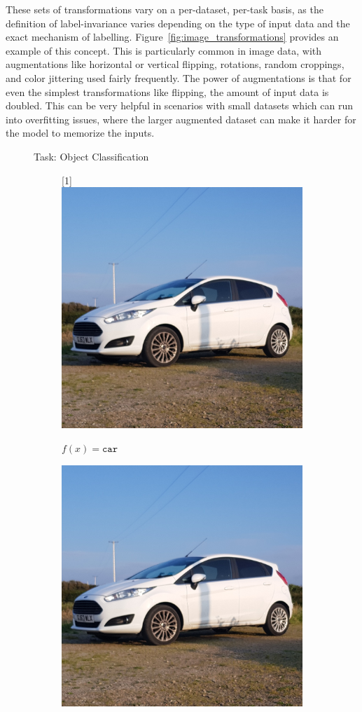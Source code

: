 \noindent These sets of transformations vary on a per-dataset, per-task basis, as the definition of label-invariance
varies depending on the type of input data and the exact mechanism of labelling. Figure~\ref{fig:image_transformations}
provides an example of this concept. This is particularly common in image data, with augmentations like horizontal
or vertical flipping, rotations, random croppings, and color jittering used fairly frequently. The power of augmentations
is that for even the simplest transformations like flipping, the amount of input data is doubled. This can be very helpful
in scenarios with small datasets which can run into overfitting issues, where the larger augmented dataset can make
it harder for the model to memorize the inputs.

\begin{figure}[ht!]
	\centering
	Task: Object Classification \\ \vspace{1em}
	\begin{subfigure}{.4\textwidth}
		\centering
		\scalebox{-1}[1]{\includegraphics[width=.5\textwidth]{data/fiesta}}
		\caption{$f(x) = \texttt{car}$}
	\end{subfigure}
	\begin{subfigure}{.4\textwidth}
		\centering
		\includegraphics[width=.5\textwidth]{data/fiesta}

\end{subfigure}
\end{figure}
